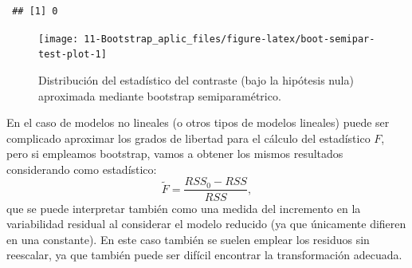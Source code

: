 \documentclass[
]{book}
\newenvironment{Shaded}{\begin{snugshade}}{\end{snugshade}}
\newcommand{\AttributeTok}[1]{\textcolor[rgb]{0.77,0.63,0.00}{#1}}
\newcommand{\ConstantTok}[1]{\textcolor[rgb]{0.00,0.00,0.00}{#1}}
\newcommand{\DecValTok}[1]{\textcolor[rgb]{0.00,0.00,0.81}{#1}}
\newcommand{\FunctionTok}[1]{\textcolor[rgb]{0.00,0.00,0.00}{#1}}
\newcommand{\NormalTok}[1]{#1}
\newcommand{\OtherTok}[1]{\textcolor[rgb]{0.56,0.35,0.01}{#1}}
\newcommand{\SpecialCharTok}[1]{\textcolor[rgb]{0.00,0.00,0.00}{#1}}
\newcommand{\StringTok}[1]{\textcolor[rgb]{0.31,0.60,0.02}{#1}}
\theoremstyle{break}
\theoremstyle{nonumberplain}
\begin{document}
\begin{Shaded}
\end{Shaded}

\begin{verbatim}
 ## [1] 0
\end{verbatim}

\begin{figure}[!htb]

{\centering \texttt{[image: 11-Bootstrap\_aplic\_files/figure-latex/boot-semipar-test-plot-1]} 

}

\caption{Distribución del estadístico del contraste (bajo la hipótesis nula) aproximada mediante bootstrap semiparamétrico.}\label{fig:boot-semipar-test-plot}
\end{figure}

En el caso de modelos no lineales (o otros tipos de modelos lineales) puede ser
complicado aproximar los grados de libertad para el cálculo del estadístico \(F\),
pero si empleamos bootstrap, vamos a obtener los mismos resultados considerando
como estadístico:
\[\tilde F =\frac{RSS_0 - RSS}{RSS},\]
que se puede interpretar también como una medida del incremento en la variabilidad residual
al considerar el modelo reducido (ya que únicamente difieren en una constante).
En este caso también se suelen emplear los residuos sin reescalar, ya que también puede ser
difícil encontrar la transformación adecuada.
\end{document}
